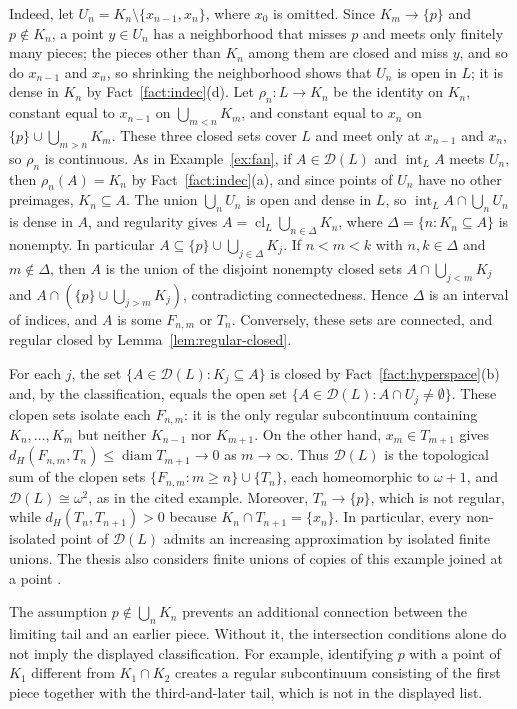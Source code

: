 \documentclass[11pt]{amsart}
\theoremstyle{definition}
\theoremstyle{remark}
\newcommand{\diam}{\operatorname{diam}}
\newcommand{\D}{\mathcal{D}}
\newcommand{\dH}{d_H}
\begin{document}
Indeed, let $U_n=K_n\setminus\{x_{n-1},x_n\}$, where $x_0$ is omitted. Since $K_m\to\{p\}$ and $p\notin K_n$, a point $y\in U_n$ has a neighborhood that misses $p$ and meets only finitely many pieces; the pieces other than $K_n$ among them are closed and miss $y$, and so do $x_{n-1}$ and $x_n$, so shrinking the neighborhood shows that $U_n$ is open in $L$; it is dense in $K_n$ by Fact~\ref{fact:indec}(d). Let $\rho_n\colon L\to K_n$ be the identity on $K_n$, constant equal to $x_{n-1}$ on $\bigcup_{m<n}K_m$, and constant equal to $x_n$ on $\{p\}\cup\bigcup_{m>n}K_m$. These three closed sets cover $L$ and meet only at $x_{n-1}$ and $x_n$, so $\rho_n$ is continuous. As in Example~\ref{ex:fan}, if $A\in\D(L)$ and $\operatorname{int}_LA$ meets $U_n$, then $\rho_n(A)=K_n$ by Fact~\ref{fact:indec}(a), and since points of $U_n$ have no other preimages, $K_n\subseteq A$. The union $\bigcup_nU_n$ is open and dense in $L$, so $\operatorname{int}_LA\cap\bigcup_nU_n$ is dense in $A$, and regularity gives $A=\operatorname{cl}_L\bigcup_{n\in\Delta}K_n$, where $\Delta=\{n:K_n\subseteq A\}$ is nonempty. In particular $A\subseteq\{p\}\cup\bigcup_{j\in\Delta}K_j$. If $n<m<k$ with $n,k\in\Delta$ and $m\notin\Delta$, then $A$ is the union of the disjoint nonempty closed sets $A\cap\bigcup_{j<m}K_j$ and $A\cap(\{p\}\cup\bigcup_{j>m}K_j)$, contradicting connectedness. Hence $\Delta$ is an interval of indices, and $A$ is some $F_{n,m}$ or $T_n$. Conversely, these sets are connected, and regular closed by Lemma~\ref{lem:regular-closed}.

For each $j$, the set $\{A\in\D(L):K_j\subseteq A\}$ is closed by Fact~\ref{fact:hyperspace}(b) and, by the classification, equals the open set $\{A\in\D(L):A\cap U_j\neq\emptyset\}$. These clopen sets isolate each $F_{n,m}$: it is the only regular subcontinuum containing $K_n,\ldots,K_m$ but neither $K_{n-1}$ nor $K_{m+1}$. On the other hand, $x_m\in T_{m+1}$ gives $\dH(F_{n,m},T_n)\le\diam T_{m+1}\to0$ as $m\to\infty$. Thus $\D(L)$ is the topological sum of the clopen sets $\{F_{n,m}:m\ge n\}\cup\{T_n\}$, each homeomorphic to $\omega+1$, and $\D(L)\cong\omega^2$, as in the cited example. Moreover, $T_n\to\{p\}$, which is not regular, while $\dH(T_n,T_{n+1})>0$ because $K_n\cap T_{n+1}=\{x_n\}$. In particular, every non-isolated point of $\D(L)$ admits an increasing approximation by isolated finite unions. The thesis also considers finite unions of copies of this example joined at a point \cite[Section~3.2.1]{Ra}.

The assumption $p\notin\bigcup_nK_n$ prevents an additional connection between the limiting tail and an earlier piece. Without it, the intersection conditions alone do not imply the displayed classification. For example, identifying $p$ with a point of $K_1$ different from $K_1\cap K_2$ creates a regular subcontinuum consisting of the first piece together with the third-and-later tail, which is not in the displayed list.
\end{document}
